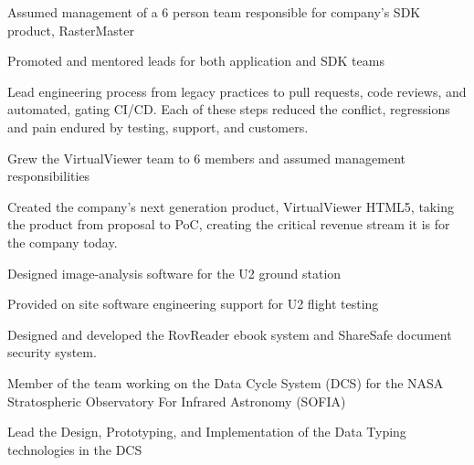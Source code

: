 \documentclass[letterpaper,10pt]{article}
\begin{document}
  \begin{resume_list}
    \item Assumed management of a 6 person team responsible for company's SDK product, RasterMaster
    \item Promoted and mentored leads for both application and SDK teams
    \item Lead engineering process from legacy practices to pull requests, code reviews, and automated, gating CI/CD.  Each of these steps reduced the conflict, regressions and pain endured by testing, support, and customers.
  \end{resume_list}

     
  \begin{resume_list}
    \item  Grew the VirtualViewer team to 6 members and assumed management responsibilities 
  \end{resume_list}

  \begin{resume_list}
      \item Created the company's next generation product, VirtualViewer HTML5, taking the product from proposal to PoC, creating the critical revenue stream it is for the company today.
  \end{resume_list}

  \begin{resume_list}
    \item Designed image-analysis software for the U2 ground station
    \item Provided on site software engineering support for U2 flight testing
  \end{resume_list}
  
  \begin{resume_list}
      \item Designed and developed the RovReader ebook system and ShareSafe document security system.
  \end{resume_list}
  
  \begin{resume_list}
    \item Member of the team working on the Data Cycle System (DCS) for the NASA Stratospheric Observatory For Infrared Astronomy (SOFIA)
    \item Lead the Design, Prototyping, and Implementation of the Data Typing technologies in the DCS 
  \end{resume_list}
\end{document}
